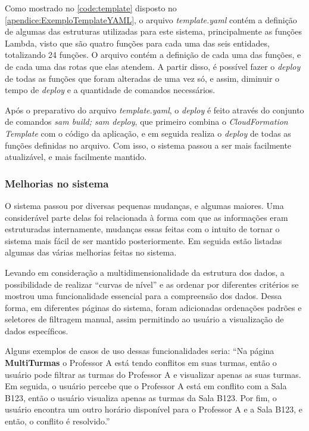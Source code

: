 Como mostrado no \autoref{code:template} disposto no \autoref{apendice:ExemploTemplateYAML}, o arquivo \textit{template.yaml} contém a definição de algumas das estruturas utilizadas para este sistema, principalmente as funções Lambda, visto que são quatro funções para cada uma das seis entidades, totalizando 24 funções. O arquivo contém a definição de cada uma das funções, e de cada uma das rotas que elas atendem. A partir disso, é possível fazer o \textit{deploy} de todas as funções que foram alteradas de uma vez só, e assim, diminuir o tempo de \textit{deploy} e a quantidade de comandos necessários.

Após o preparativo do arquivo \textit{template.yaml}, o \textit{deploy} é feito através do conjunto de comandos \textit{sam build; sam deploy}, que primeiro combina o \textit{CloudFormation Template} com o código da aplicação, e em seguida realiza o \textit{deploy} de todas as funções definidas no arquivo. Com isso, o sistema passou a ser mais facilmente atualizável, e mais facilmente mantido.

\subsubsection*{Melhorias no sistema} \label{sssec:Melhorias no Sistema}

O sistema passou por diversas pequenas mudanças, e algumas maiores. Uma considerável parte delas foi relacionada à forma com que as informações eram estruturadas internamente, mudanças essas feitas com o intuito de tornar o sistema mais fácil de ser mantido posteriormente. Em seguida estão listadas algumas das várias melhorias feitas no sistema.

 \label{ssssec:Filtros e ordenações}

Levando em consideração a multidimensionalidade da estrutura dos dados, a possibilidade de realizar ``curvas de nível'' e as ordenar por diferentes critérios se mostrou uma funcionalidade essencial para a compreensão dos dados. Dessa forma, em diferentes páginas do sistema, foram adicionadas ordenações padrões e seletores de filtragem manual, assim permitindo ao usuário a visualização de dados específicos.

Alguns exemplos de casos de uso dessas funcionalidades seria: ``Na página \textbf{MultiTurmas} o Professor A está tendo conflitos em suas turmas, então o usuário pode filtrar as turmas do Professor A e visualizar apenas as suas turmas. Em seguida, o usuário percebe que o Professor A está em conflito com a Sala B123, então o usuário visualiza apenas as turmas da Sala B123. Por fim, o usuário encontra um outro horário disponível para o Professor A e a Sala B123, e então, o conflito é resolvido.''

